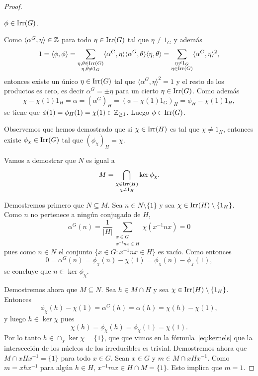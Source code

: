 \begin{proof}
  \begin{claim}
  $\phi\in\operatorname{Irr}(G)$.
  \end{claim}
  
  Como $\langle\alpha^G,\eta\rangle\in\mathbb{Z}$ para todo $\eta\in\operatorname{Irr}(G)$ tal que $\eta\ne 1_G$ y además 
  \[
  1=\langle\phi,\phi\rangle
  =\sum_{\substack{\eta,\theta\in\operatorname{Irr}(G)\\\eta,\theta\ne1_G}}\langle\alpha^G,\eta\rangle\langle\alpha^G,\theta\rangle\langle\eta,\theta\rangle
  =\sum_{\substack{\eta\ne 1_G\\\eta\in\operatorname{Irr}(G)}}\langle\alpha^G,\eta\rangle^2,
  \]
  entonces existe un único $\eta\in\operatorname{Irr}(G)$ tal que 
  $\langle\alpha^G,\eta\rangle^2=1$ y el resto de los productos es cero, es decir 
  $\alpha^G=\pm\eta$ para un cierto $\eta\in\operatorname{Irr}(G)$. Como además 
  \[
  \chi-\chi(1)1_H=\alpha=(\alpha^G)_H=(\phi-\chi(1)1_G)_H=\phi_H-\chi(1)1_H,
  \]
  se tiene que $\phi(1)=\phi_H(1)=\chi(1)\in\mathbb{Z}_{\geq1}$. Luego $\phi\in\operatorname{Irr}(G)$. 

  \medskip
  Observemos que hemos demostrado que si $\chi\in\operatorname{Irr}(H)$ es tal que $\chi\ne 1_H$, entonces
  existe $\phi_\chi\in\operatorname{Irr}(G)$ tal que $(\phi_\chi)_H=\chi$. 
  
  \medskip
  Vamos a demostrar que $N$ es igual a
  \[
	M=\bigcap_{\substack{\chi\in\operatorname{Irr}(H)\\\chi\ne1_H}}\ker\phi_{\chi}.
  \]

  Demostremos primero que $N\subseteq M$. 
  Sea $n\in N\setminus\{1\}$ y sea $\chi\in\operatorname{Irr}(H)\setminus\{1_H\}$. Como $n$ no pertenece
  a ningún conjugado de $H$, 
  \[
	\alpha^G(n)=\frac{1}{|H|}\sum_{\substack{x\in G\\x^{-1}nx\in H}}\chi(x^{-1}nx)=0
  \]
  pues como $n\in N$ el conjunto $\{x\in G:x^{-1}nx\in H\}$ es vacío. Como entonces 
  \[
  0=\alpha^G(n)
  =\phi_{\chi}(n)-\chi(1)=\phi_{\chi}(n)-\phi_{\chi}(1),
  \]
  se concluye que $n\in\ker\phi_{\chi}$. 
  
  Demostremos ahora que $M\subseteq N$. 
  Sea $h\in M\cap H$ y sea $\chi\in\operatorname{Irr}(H)\setminus\{1_H\}$. Entonces
  \[
    \phi_{\chi}(h)-\chi(1)=\alpha^G(h)=\alpha(h)=\chi(h)-\chi(1),
  \]
  y luego $h\in\ker\chi$ pues 
  \[
    \chi(h)=\phi_{\chi}(h)=\phi_{\chi}(1)=\chi(1).
  \]
  Por lo tanto $h\in\cap_{\chi}\ker\chi=\{1\}$, que que vimos en la fórmula~\eqref{eq:kernels} que
  la intersección de los núcleos de los irreducibles es trivial. Demostremos ahora que $M\cap
  xHx^{-1}=\{1\}$ para todo $x\in G$. Sean $x\in G$ y $m\in M\cap xHx^{-1}$. Como
  $m=xhx^{-1}$ para algún $h\in H$, $x^{-1}mx\in H\cap M=\{1\}$.  Esto implica que
  $m=1$.
\end{proof}

